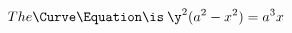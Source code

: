 \documentclass[preview]{standalone}
\begin{document}
\begin{align*}
The \Curve \Equation \is\: \y^2 (a^2 - x^2) = a^3 x
\end{align*}
\end{document}
